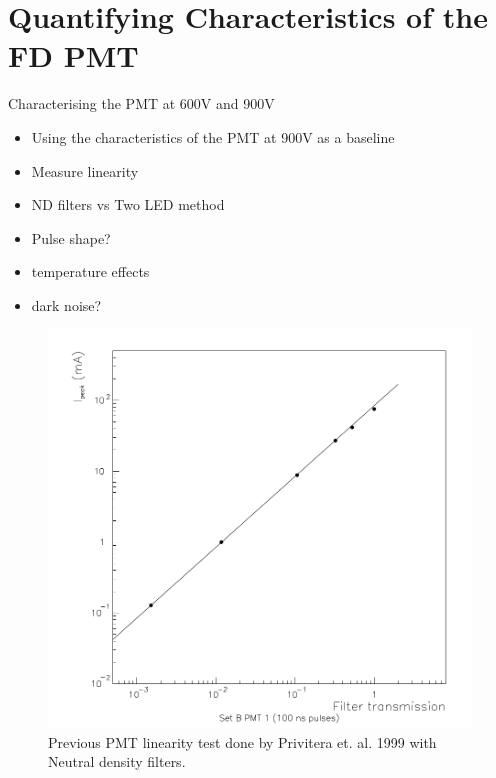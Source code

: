 \chapter{Quantifying Characteristics of the FD PMT}\label{Ch:PMTCharacter}

Characterising the PMT at 600V and 900V
\begin{itemize}
\item Using the characteristics of the PMT at 900V as a baseline
\item Measure linearity
\item ND filters vs Two LED method
\item Pulse shape?
\item temperature effects
\item dark noise?
\end{itemize}

\begin{figure}
\centering
\includegraphics[width=\textwidth]{chapters/graphs/PMTchar/pmt_linearity_100V_privitera.png}
\caption{Previous PMT linearity test done by Privitera et. al. 1999 with Neutral density filters.}
\end{figure}

